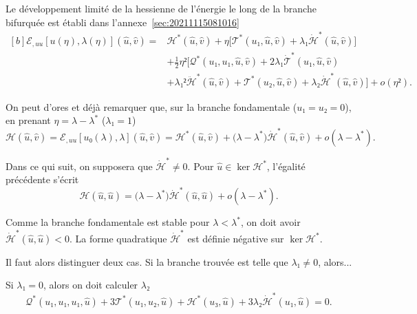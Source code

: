 \documentclass[12pt, final]{amsart}
\begin{document}
Le développement limité de la hessienne de l'énergie le long de la
branche bifurquée est établi dans l'annexe~\ref{sec:20211115081016}
\begin{equation}
  \label{eq:20211115082025}
  \begin{aligned}[b]
    ℰ_{,uu}[u(η), \lambda(η)](\hat{u}, \hat{v})
    ={}&\mathcal H^\ast(\hat{u}, \hat{v})
    +η\bigl[\mathcal T^\ast(u₁, \hat{u}, \hat{v})
    +\lambda₁\dot{\mathcal H}^\ast(\hat{u}, \hat{v})\bigr]\\
    &+\tfrac12η²\bigl[\mathcal Q^\ast(u₁, u₁, \hat{u}, \hat{v})
    +2\lambda₁\dot{\mathcal T}^\ast(u₁, \hat{u}, \hat{v})\\
    &+\lambda₁²\ddot{\mathcal H}^\ast(\hat{u}, \hat{v})
    +\mathcal T^\ast(u₂, \hat{u}, \hat{v})
    +\lambda₂\dot{\mathcal H}^\ast(\hat{u}, \hat{v})\bigr]+o(η²).
  \end{aligned}
\end{equation}

On peut d'ores et déjà remarquer que, sur la branche fondamentale
(\(u₁=u₂=0\)), en prenant \(η=\lambda-\lambda^\ast\) (\(\lambda₁=1\))
\begin{equation}
  \mathcal H(\hat{u}, \hat{v})
  =ℰ_{,uu}[u₀(\lambda), \lambda](\hat{u}, \hat{v})
  =\mathcal H^\ast(\hat{u}, \hat{v})
  +\bigl(\lambda-\lambda^\ast\bigr)\dot{\mathcal H}^\ast(\hat{u}, \hat{v})
  +o(\lambda-\lambda^\ast).
\end{equation}

Dans ce qui suit, on supposera que \(\dot{\mathcal H}^\ast≠ 0\). Pour
\(\hat{u}∈\ker\mathcal H^\ast\), l'égalité précédente s'écrit
\begin{equation}
  \mathcal H(\hat{u}, \hat{u})
  =\bigl(\lambda-\lambda^\ast\bigr)\dot{\mathcal H}^\ast(\hat{u}, \hat{u})
  +o(\lambda-\lambda^\ast).
\end{equation}

Comme la branche fondamentale est stable pour \(\lambda<\lambda^\ast\), on doit
avoir \(\dot{\mathcal H}^\ast(\hat{u}, \hat{u})<0\). La forme quadratique
\(\dot{\mathcal H}^\ast\) est définie négative sur \(\ker\mathcal H^\ast\).


Il faut alors distinguer deux cas. Si la branche trouvée est telle que
\(\lambda₁≠0\), alors...

Si \(\lambda₁=0\), alors on doit calculer \(\lambda₂\)
\begin{equation}
  \mathcal Q^\ast(u₁, u₁, u₁, \hat{u})
  +3\mathcal T^\ast(u₁, u₂, \hat{u})+\mathcal H^\ast(u₃, \hat{u})
  +3\lambda₂\dot{\mathcal H}^\ast(u₁, \hat{u})=0.
\end{equation}
\end{document}
